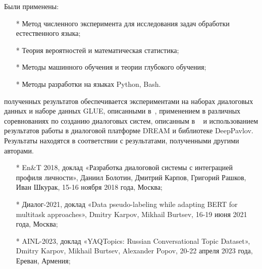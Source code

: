{\methods}
Были
применены: %
\begin{enumerate}
\item[*] Метод численного эксперимента для исследования задач обработки естественного языка;
\item[*] Теория вероятностей и математическая статистика;
\item[*] Методы машинного обучения и теории глубокого обучения;
\item[*] Методы разработки на языках Python, Bash.
\end{enumerate}




{\reliability} полученных результатов обеспечивается экспериментами на наборах диалоговых данных и наборе данных GLUE, описанными в~\cite{pseudolabel,rumtl,enmtl,rutopics,dp_2023}, применением в различных соревнованиях по созданию диалоговых систем, описанным в ~\cite{dream1,dream2,dream1_trudy,Болотин_Карпов_Рашков_Шкурак_2019} и использованием результатов работы в диалоговой платформе DREAM и библиотеке DeepPavlov. Результаты находятся в соответствии с результатами, полученными другими авторами.

{\probation}
\begin{itemize}
   \item[*] En\&T 2018, доклад «Разработка диалоговой системы с интеграцией профиля личности», Даниил Болотин, Дмитрий Карпов, Григорий Рашков, Иван Шкурак, 15-16 ноября 2018 года, Москва;
   \item[*] Диалог-2021, доклад «Data pseudo-labeling while adapting BERT for multitask approaches», Dmitry Karpov, Mikhail Burtsev, 16-19 июня 2021 года, Москва;
   \item[*] AINL-2023, доклад «YAQTopics: Russian Conversational Topic Dataset», Dmitry Karpov, Mikhail Burtsev, Alexander Popov, 20-22 апреля 2023 года, Ереван, Армения;
\end{itemize}%


